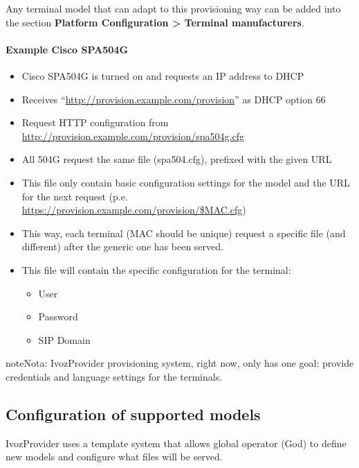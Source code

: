 \documentclass[letterpaper,10pt,spanish]{sphinxmanual}
\begin{document}
Any terminal model that can adapt to this provisioning way can be added into
the section \textbf{Platform Configuration \textgreater{} Terminal manufacturers}.
\paragraph{Example Cisco SPA504G}
\begin{itemize}
\item {} 
Cisco SPA504G is turned on and requests an IP address to DHCP

\item {} 
Receives “\url{http://provision.example.com/provision}” as DHCP option 66

\item {} 
Request HTTP configuration from \url{http://provision.example.com/provision/spa504g.cfg}

\item {} 
All 504G request the same file (spa504.cfg), prefixed with the given URL

\item {} 
This file only contain basic configuration settings for the model and the URL
for the next request (p.e. \url{https://provision.example.com/provision/\$MAC.cfg})

\item {} 
This way, each terminal (MAC should be unique) request a specific file
(and different) after the generic one has been served.

\item {} 
This file will contain the specific configuration for the terminal:
\begin{itemize}
\item {} 
User

\item {} 
Password

\item {} 
SIP Domain

\end{itemize}

\end{itemize}

\begin{notice}{note}{Nota:}
IvozProvider provisioning system, right now, only has one goal:
provide credentials and language settings for the terminals.
\end{notice}


\subsection{Configuration of supported models}
\label{administration_portal/platform/terminal_manufacturers:configuration-of-supported-models}
IvozProvider uses a template system that allows global operator (God) to
define new models and configure what files will be served.
\end{document}
